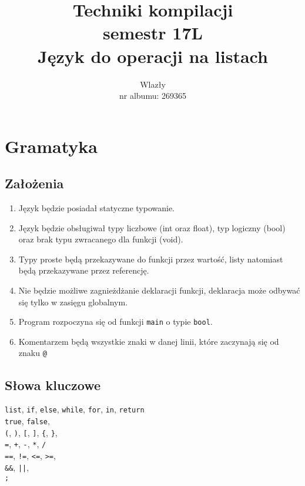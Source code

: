 \documentclass{article}
\title{\vspace{7cm}\LARGE Techniki kompilacji\\semestr 17L\\Język do operacji na listach}
\author{\LargeŁukasz Wlazły\\nr albumu: 269365}
\date{}
\newcommand{\keyword}[1]{\colorbox{light-gray}{\texttt{#1}}}
\newcommand{\code}[1]{\texttt{#1}}
\begin{document}
\maketitle
{}
\newpage
{}

\section{Gramatyka}

\subsection{Założenia}
\begin{enumerate}
\item Język będzie posiadał statyczne typowanie.
\item Język będzie obsługiwał typy liczbowe (int oraz float), typ logiczny (bool) oraz brak typu zwracanego dla funkcji (void).
\item Typy proste będą przekazywane do funkcji przez wartość, listy natomiast będą przekazywane przez referencję.
\item Nie będzie możliwe zagnieżdżanie deklaracji funkcji, deklaracja może odbywać się tylko w zasięgu globalnym.
\item Program rozpoczyna się od funkcji \code{main} o typie \keyword{bool}.
\item Komentarzem będą wszystkie znaki w danej linii, które zaczynają się od znaku \keyword{@}
\end{enumerate}

\subsection{Słowa kluczowe}
\keyword{list}, \keyword{if}, \keyword{else}, \keyword{while}, \keyword{for}, \keyword{in}, \keyword{return}\\
\keyword{true}, \keyword{false}, \\
\keyword{(}, \keyword{)}, \keyword{[}, \keyword{]}, \keyword{\{}, \keyword{\}}, \\
\keyword{=}, \keyword{+}, \keyword{-}, \keyword{*}, \keyword{/} \\
\keyword{==}, \keyword{!=}, \keyword{<=}, \keyword{>=}, \\
\keyword{\&\&}, \keyword{||}, \\
\keyword{;}
\end{document}
